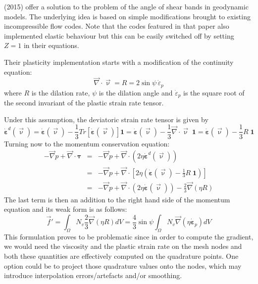 \textcite{chpe15} (2015) offer a solution to the problem of the angle of shear bands in 
geodynamic models. The underlying idea is based on simple modifications 
brought to existing incompressible flow codes. Note that the codes
featured in that paper also implemented elastic behaviour but this can 
be easily switched off by setting $Z=1$ in their equations.

Their plasticity implementation starts with a modification of the continuity equation:
\[
\vec\nabla\cdot\vec\upnu = R = 2 \sin\psi \, \dot{\varepsilon}_p
\]
where $R$ is the dilation rate, $\psi$ is the dilation angle 
and $\dot{\varepsilon}_p$ is the square root of 
the second invariant of the plastic strain rate tensor.

Under this assumption, the deviatoric strain rate tensor is given by
\begin{equation}
\dot{\bm \varepsilon}^d(\vec\upnu)
= \dot{\bm \varepsilon}(\vec\upnu)- \frac{1}{3} Tr[\dot{\bm \varepsilon}(\vec\upnu)] {\bm 1}
= \dot{\bm \varepsilon}(\vec\upnu)- \frac{1}{3} \vec\nabla\cdot\vec\upnu \; {\bm 1}
= \dot{\bm \varepsilon}(\vec\upnu)- \frac{1}{3} R \; {\bm 1}
\end{equation}
Turning now to the momentum conservation equation:
\begin{eqnarray}
-\vec\nabla p + \vec\nabla \cdot {\bm \tau} 
&=& -\vec\nabla p + \vec\nabla \cdot (2 \eta \dot{\bm \varepsilon}^d(\vec\upnu)) \nonumber \\
&=& -\vec\nabla p + \vec\nabla \cdot \left[ 2 \eta \left(\dot{\bm \varepsilon}(\vec\upnu)- \frac{1}{3} R \; {\bm 1}\right) \right] \nonumber\\
&=& -\vec\nabla p 
+ \vec\nabla \cdot \left( 2 \eta \dot{\bm \varepsilon}(\vec\upnu)\right) -\frac{2}{3} \vec\nabla(\eta R) 
\label{chpeform}
\end{eqnarray}
The last term is then an addition to the right hand side of the momentum equation 
and its weak form is as follows:
\begin{equation}
\vec f' 
= \int_\Omega N_v \frac{2}{3} \vec\nabla(\eta R) dV
= \frac{4}{3} \sin \psi \int_\Omega N_v \vec\nabla(\eta \dot{\bm \varepsilon}_p) dV
\end{equation}
This formulation proves to be problematic since in order to compute the gradient, we would
need the viscosity and the plastic strain rate on the mesh nodes and both these quantities
are effectively computed on the quadrature points. One option could be to project those quadrature
values onto the nodes, which may introduce interpolation errors/artefacts and/or smoothing. 
